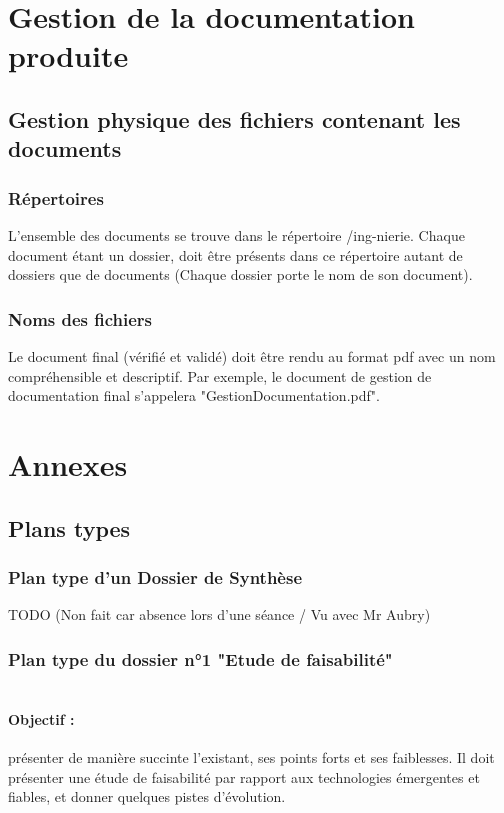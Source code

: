 \section{Gestion de la documentation produite}
  \subsection{Gestion physique des fichiers contenant les documents}     
    \subsubsection{Répertoires}
      L'ensemble des documents se trouve dans le répertoire /ing-nierie.
      Chaque document étant un dossier, doit être présents dans ce répertoire autant de dossiers que de documents (Chaque dossier porte le nom de son document).
    \subsubsection{Noms des fichiers}
    Le document final (vérifié et validé) doit être rendu au format pdf avec un nom compréhensible et descriptif. Par exemple, le document de gestion de documentation final s'appelera "GestionDocumentation.pdf".
    
    
\section{Annexes}
  \subsection{Plans types}     
    \subsubsection{Plan type d'un Dossier de Synthèse}
                   TODO (Non fait car absence lors d'une séance / Vu avec Mr Aubry)
    \subsubsection{Plan type du dossier n°1 "Etude de faisabilité"}
      \paragraph*{\\Objectif :}
        présenter de manière succinte l'existant, ses points forts et ses faiblesses. Il doit
        présenter une étude de faisabilité par rapport aux technologies émergentes et fiables, et donner quelques pistes d'évolution.
